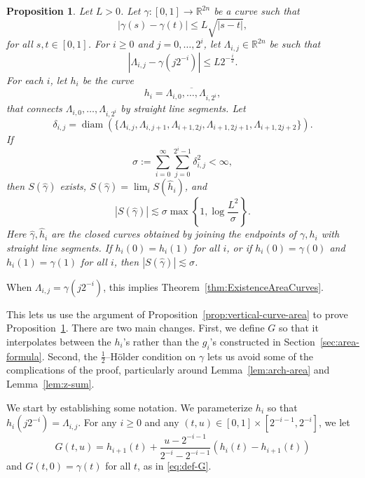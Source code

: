 \documentclass[12pt,reqno]{amsart}
\newcommand{\R}{\mathbb{R}}
\newcommand{\from}{\colon}
\newtheorem{prop}[thm]{Proposition}
\theoremstyle{remark}
\newcommand{\0}{\mathbf{0}}
\renewcommand{\1}{\mathbf 1}
\DeclareMathOperator{\diam}{diam}
\begin{document}
\begin{prop}\label{prop:rn-curve-area}
  Let $L>0$. Let $\gamma\from [0,1] \to \R^{2n}$ be a curve such that
  \begin{equation}\label{eq:rn-gamma-holder}
    |\gamma(s) - \gamma(t)| \le L \sqrt{|s-t|},
  \end{equation}
  for all $s,t\in [0,1]$. For $i\ge 0$ and $j=0,\dots, 2^i$, let $\Lambda_{i,j} \in \R^{2n}$ be such that
  \begin{equation}\label{eqn:Lambdaij}
  |\Lambda_{i,j} - \gamma(j2^{-i})| \leq L 2^{-\frac{i}{2}}.
  \end{equation}
  For each $i$, let $h_i$ be the curve
  \begin{equation}\label{eqn:girn}
  h_i =\overline{\Lambda_{i,0},\dots, \Lambda_{i,2^i}},
  \end{equation}
  that connects $\Lambda_{i,0},\dots, \Lambda_{i,2^i}$ by straight line segments. Let
  $$\delta_{i,j} = \diam(\{\Lambda_{i,j}, \Lambda_{i,j+1}, \Lambda_{i+1,2j}, \Lambda_{i+1,2j+1}, \Lambda_{i+1,2j+2}\}).$$
  If
  \begin{equation}\label{eqn:ConditionSigmaRn}
  \sigma := \sum_{i=0}^\infty \sum_{j=0}^{2^i-1} \delta_{i,j}^2 < \infty,
  \end{equation}
  then $S(\hat{\gamma})$ exists, $S(\hat{\gamma}) = \lim_iS(\hat{h}_i)$, and 
  \begin{equation}\label{eq:sgi-bound-rn}
    |S(\hat{\gamma})| \lesssim \sigma \max\left\{1, \log \frac{L^2}{\sigma}\right\}.
  \end{equation}
  Here $\hat\gamma,\hat h_i$ are the closed curves obtained by joining the endpoints of $\gamma,h_i$ with straight line segments. If $h_i(0)=h_i(1)$ for all $i$, or if $h_i(0) = \gamma(0)$ and $h_i(1) = \gamma(1)$ for all $i$, then 
  $|S(\hat{\gamma})| \lesssim \sigma$.
\end{prop}
When $\Lambda_{i,j}=\gamma(j2^{-i})$, this implies Theorem~\ref{thm:ExistenceAreaCurves}. 

This lets us use the argument of Proposition~\ref{prop:vertical-curve-area} to prove Proposition~\ref{prop:rn-curve-area}. There are two main changes. First, we define $G$ so that it interpolates between the $h_i$'s rather than the $g_i$'s constructed in Section~\ref{sec:area-formula}. Second, the $\frac{1}{2}$--Hölder condition on $\gamma$ lets us avoid some of the complications of the proof, particularly around Lemma~\ref{lem:arch-area} and Lemma~\ref{lem:z-sum}.

We start by establishing some notation. We parameterize $h_i$ so that $h_i(j2^{-i}) = \Lambda_{i,j}$. For any $i\ge 0$ and any $(t, u) \in [0,1]\times [2^{-i-1}, 2^{-i}]$, we let
\begin{equation*}
  G(t, u) = h_{i+1}(t) + \frac{u - 2^{-i-1}}{2^{-i} - 2^{-i-1}} (h_i(t) - h_{i+1}(t))
\end{equation*}
and $G(t,0)=\gamma(t)$ for all $t$, as in \eqref{eq:def-G}.
\end{document}
